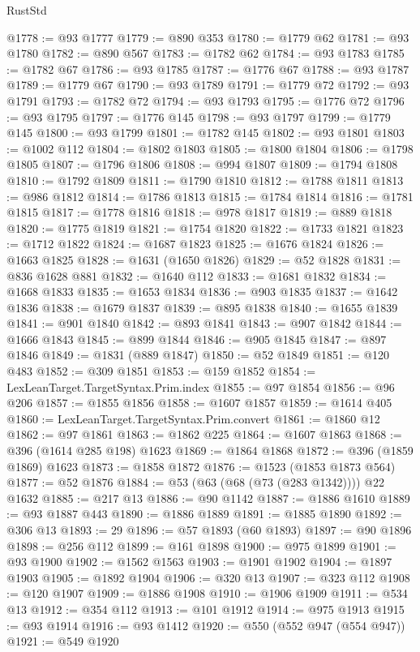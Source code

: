 \begin{lexlean}{RustStd}
\begin{coremodule}
@1778 := @93 @1777
@1779 := @890 @353
@1780 := @1779 @62
@1781 := @93 @1780
@1782 := @890 @567
@1783 := @1782 @62
@1784 := @93 @1783
@1785 := @1782 @67
@1786 := @93 @1785
@1787 := @1776 @67
@1788 := @93 @1787
@1789 := @1779 @67
@1790 := @93 @1789
@1791 := @1779 @72
@1792 := @93 @1791
@1793 := @1782 @72
@1794 := @93 @1793
@1795 := @1776 @72
@1796 := @93 @1795
@1797 := @1776 @145
@1798 := @93 @1797
@1799 := @1779 @145
@1800 := @93 @1799
@1801 := @1782 @145
@1802 := @93 @1801
@1803 := @1002 @112
@1804 := @1802 @1803
@1805 := @1800 @1804
@1806 := @1798 @1805
@1807 := @1796 @1806
@1808 := @994 @1807
@1809 := @1794 @1808
@1810 := @1792 @1809
@1811 := @1790 @1810
@1812 := @1788 @1811
@1813 := @986 @1812
@1814 := @1786 @1813
@1815 := @1784 @1814
@1816 := @1781 @1815
@1817 := @1778 @1816
@1818 := @978 @1817
@1819 := @889 @1818
@1820 := @1775 @1819
@1821 := @1754 @1820
@1822 := @1733 @1821
@1823 := @1712 @1822
@1824 := @1687 @1823
@1825 := @1676 @1824
@1826 := @1663 @1825
@1828 := @1631 (@1650 @1826)
@1829 := @52 @1828
@1831 := @836 @1628 @881
@1832 := @1640 @112
@1833 := @1681 @1832
@1834 := @1668 @1833
@1835 := @1653 @1834
@1836 := @903 @1835
@1837 := @1642 @1836
@1838 := @1679 @1837
@1839 := @895 @1838
@1840 := @1655 @1839
@1841 := @901 @1840
@1842 := @893 @1841
@1843 := @907 @1842
@1844 := @1666 @1843
@1845 := @899 @1844
@1846 := @905 @1845
@1847 := @897 @1846
@1849 := @1831 (@889 @1847)
@1850 := @52 @1849
@1851 := @120 @483
@1852 := @309 @1851
@1853 := @159 @1852
@1854 := LexLeanTarget.TargetSyntax.Prim.index
@1855 := @97 @1854
@1856 := @96 @206
@1857 := @1855 @1856
@1858 := @1607 @1857
@1859 := @1614 @405
@1860 := LexLeanTarget.TargetSyntax.Prim.convert
@1861 := @1860 @12
@1862 := @97 @1861
@1863 := @1862 @225
@1864 := @1607 @1863
@1868 := @396 (@1614 @285 @198) @1623
@1869 := @1864 @1868
@1872 := @396 (@1859 @1869) @1623
@1873 := @1858 @1872
@1876 := @1523 (@1853 @1873 @564)
@1877 := @52 @1876
@1884 := @53 (@63 (@68 (@73 (@283 @1342)))) @22 @1632
@1885 := @217 @13
@1886 := @90 @1142
@1887 := @1886 @1610
@1889 := @93 @1887 @443
@1890 := @1886 @1889
@1891 := @1885 @1890
@1892 := @306 @13
@1893 := 29
@1896 := @57 @1893 (@60 @1893)
@1897 := @90 @1896
@1898 := @256 @112
@1899 := @161 @1898
@1900 := @975 @1899
@1901 := @93 @1900
@1902 := @1562 @1563
@1903 := @1901 @1902
@1904 := @1897 @1903
@1905 := @1892 @1904
@1906 := @320 @13
@1907 := @323 @112
@1908 := @120 @1907
@1909 := @1886 @1908
@1910 := @1906 @1909
@1911 := @534 @13
@1912 := @354 @112
@1913 := @101 @1912
@1914 := @975 @1913
@1915 := @93 @1914
@1916 := @93 @1412
@1920 := @550 (@552 @947 (@554 @947))
@1921 := @549 @1920

\end{coremodule}
\end{lexlean}
